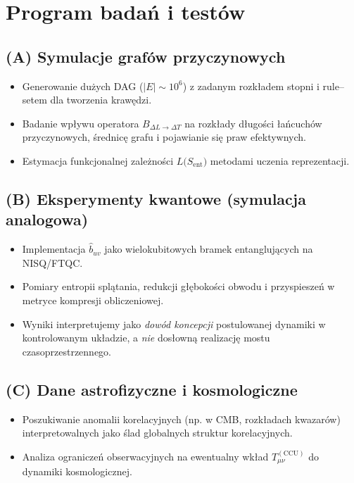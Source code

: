 \documentclass[11pt,a4paper]{article}
\begin{document}
\section{Program bada\'n i test\'ow}
\subsection*{(A) Symulacje graf\'ow przyczynowych}
\begin{itemize}[nosep]
\item Generowanie dużych DAG ($|E|\sim 10^6$) z zadanym rozkładem stopni i rule--setem dla tworzenia krawędzi.
\item Badanie wpływu operatora $B_{\Delta L \to \Delta T}$ na rozkłady długości łańcuchów przyczynowych, średnicę grafu i pojawianie się praw efektywnych.
\item Estymacja funkcjonalnej zależności $L\big(S_{\mathrm{ent}}\big)$ metodami uczenia reprezentacji.
\end{itemize}

\subsection*{(B) Eksperymenty kwantowe (symulacja analogowa)}
\begin{itemize}[nosep]
\item Implementacja $\hat{b}_{uv}$ jako wielokubitowych bramek entanglujących na NISQ/FTQC.
\item Pomiary entropii splątania, redukcji głębokości obwodu i przyspieszeń w metryce kompresji obliczeniowej.
\item Wyniki interpretujemy jako \emph{dowód koncepcji} postulowanej dynamiki w kontrolowanym układzie, a \emph{nie} dosłowną realizację mostu czasoprzestrzennego.
\end{itemize}

\subsection*{(C) Dane astrofizyczne i kosmologiczne}
\begin{itemize}[nosep]
\item Poszukiwanie anomalii korelacyjnych (np. w CMB, rozkładach kwazarów) interpretowalnych jako ślad globalnych struktur korelacyjnych.
\item Analiza ograniczeń obserwacyjnych na ewentualny wkład $T^{\mathrm{(CCU)}}_{\mu\nu}$ do dynamiki kosmologicznej.
\end{itemize}
\end{document}
